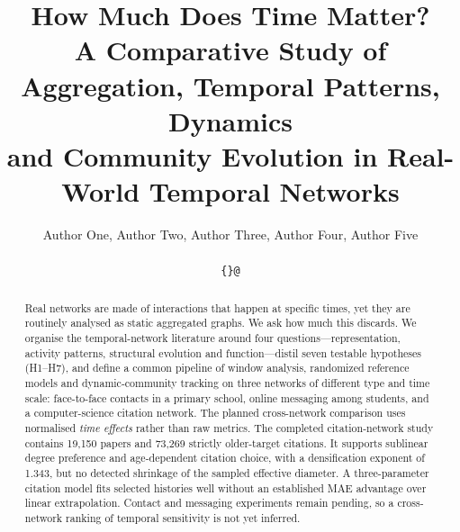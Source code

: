 \documentclass[10pt,twocolumn,letterpaper]{article}
\title{How Much Does Time Matter?\\
A Comparative Study of Aggregation, Temporal Patterns, Dynamics\\and Community Evolution in Real-World Temporal Networks}
\author{%
  Author One, Author Two, Author Three, Author Four, Author Five\\
  \sharedaffiliation\\
  {\small\texttt{\{\emailids\}@\emaildomain}}
}
\begin{document}
\maketitle

\begin{abstract}
Real networks are made of interactions that happen at specific times, yet they are
routinely analysed as static aggregated graphs. We ask how much this discards. We
organise the temporal-network literature around four questions---representation,
activity patterns, structural evolution and function---distil seven testable
hypotheses (H1--H7), and define a common pipeline of window analysis,
randomized reference models and dynamic-community tracking on three networks of
different type and time scale: face-to-face contacts in a primary school, online
messaging among students, and a computer-science citation network. The planned cross-network comparison
uses normalised \emph{time effects} rather than raw metrics.
The completed citation-network study contains 19,150 papers and 73,269
strictly older-target citations. It supports sublinear degree preference and
age-dependent citation choice, with a densification exponent of 1.343, but no
detected shrinkage of the sampled effective diameter. A three-parameter citation
model fits selected histories well without an established MAE advantage over
linear extrapolation. Contact and messaging experiments remain pending, so a
cross-network ranking of temporal sensitivity is not yet inferred.
\end{abstract}









{\small


}
\end{document}
